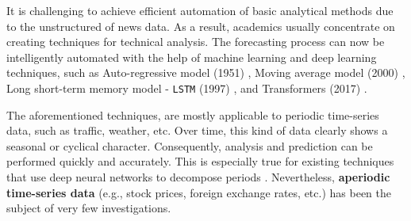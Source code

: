 
It is challenging to achieve efficient automation of basic analytical methods due to the unstructured of news data. As a result, academics usually concentrate on creating techniques for technical analysis. The forecasting process can now be intelligently automated with the help of machine learning and deep learning techniques, such as Auto-regressive model (1951) \cite{moran1951hypothesis}, Moving average model (2000) \cite{rosenblatt2000gaussian}, Long short-term memory model - \verb|LSTM| (1997) \cite{hochreiter1997long}, and Transformers (2017) \cite{vaswani2017attention}.


The aforementioned techniques, are mostly applicable to periodic time-series data, such as traffic, weather, etc. Over time, this kind of data clearly shows a seasonal or cyclical character. Consequently, analysis and prediction can be performed quickly and accurately. This is especially true for existing techniques that use deep neural networks to decompose periods \cite{liu2022scinet,chen2021autoformer,zhou2022fedformer}. Nevertheless, \textbf{aperiodic time-series data} (e.g., stock prices, foreign exchange rates, etc.) has been the subject of very few investigations.

